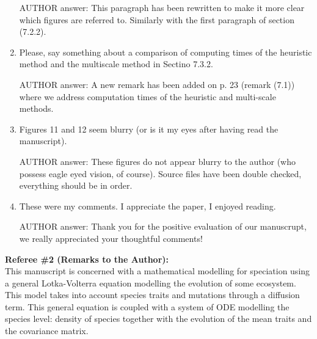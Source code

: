 \documentclass[a4paper,11pt]{scrartcl}
\begin{document}
\begin{enumerate}
AUTHOR answer: This paragraph has been rewritten to make it more clear which figures are referred to. Similarly with the first paragraph of section (7.2.2).

\item
Please, say something about a comparison of computing times of the heuristic method and the multiscale method in Sectino 7.3.2.

AUTHOR answer: A new remark has been added on p. 23 (remark (7.1)) where we address computation times of the heuristic and multi-scale methods.

\item
Figures 11 and 12 seem blurry (or is it my eyes after having read the manuscript).

AUTHOR answer: These figures do not appear blurry to the author (who possess eagle eyed vision, of course). Source files have been double checked, everything should be in order.

\item
These were my comments. I appreciate the paper, I enjoyed reading.

AUTHOR answer: Thank you for the positive evaluation of our manuscrupt, we really appreciated your thoughtful comments!
\end{enumerate}
\textbf{Referee \#2  (Remarks to the Author):}\\

This manuscript is concerned with a mathematical modelling for speciation using a general Lotka-Volterra equation modelling the evolution of some ecosystem. This model takes into account species traits and mutations through a diffusion term. This general equation is coupled with a system of ODE modelling the species level: density of species together with the evolution of the mean traits and the covariance matrix.
\end{document}
